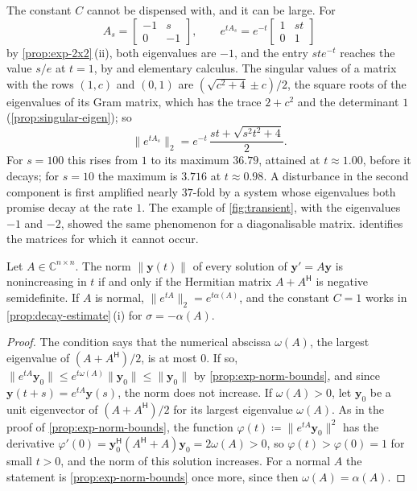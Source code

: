 The constant $C$ cannot be dispensed with, and it can be large. For
\[
A_s=\begin{bmatrix}-1&s\\0&-1\end{bmatrix},\qquad e^{tA_s}=e^{-t}\begin{bmatrix}1&st\\0&1\end{bmatrix}
\]
by \cref{prop:exp-2x2}\,(ii), both eigenvalues are $-1$, and the entry $ste^{-t}$ reaches the value $s/e$ at $t=1$, by  and elementary calculus. The singular values of a matrix with the rows $(1,c)$ and $(0,1)$ are $(\sqrt{c^2+4}\pm c)/2$, the square roots of the eigenvalues of its Gram matrix, which has the trace $2+c^2$ and the determinant $1$ (\cref{prop:singular-eigen}); so
\[
\|e^{tA_s}\|_2=e^{-t}\,\frac{st+\sqrt{s^2t^2+4}}2 .
\]
For $s=100$ this rises from $1$ to its maximum $36.79$, attained at $t\approx1.00$, before it decays; for $s=10$ the maximum is $3.716$ at $t\approx0.98$. A disturbance in the second component is first amplified nearly $37$-fold by a system whose eigenvalues both promise decay at the rate $1$. The example of \cref{fig:transient}, with the eigenvalues $-1$ and $-2$, showed the same phenomenon for a diagonalisable matrix.  identifies the matrices for which it cannot occur.

\begin{corollary}
\label{cor:monotone-decay}
Let $A\in\mathbb C^{n\times n}$. The norm $\|\mathbf y(t)\|$ of every solution of $\mathbf y'=A\mathbf y$ is nonincreasing in $t$ if and only if the Hermitian matrix $A+A^{\mathsf H}$ is negative semidefinite. If $A$ is normal, $\|e^{tA}\|_2=e^{t\alpha(A)}$, and the constant $C=1$ works in \cref{prop:decay-estimate}\,(i) for $\sigma=-\alpha(A)$.
\end{corollary}

\begin{proof}
The condition says that the numerical abscissa $\omega(A)$, the largest eigenvalue of $(A+A^{\mathsf H})/2$, is at most $0$. If so, $\|e^{tA}\mathbf y_0\|\le e^{t\omega(A)}\|\mathbf y_0\|\le\|\mathbf y_0\|$ by \cref{prop:exp-norm-bounds}, and since $\mathbf y(t+s)=e^{tA}\mathbf y(s)$, the norm does not increase. If $\omega(A)>0$, let $\mathbf y_0$ be a unit eigenvector of $(A+A^{\mathsf H})/2$ for its largest eigenvalue $\omega(A)$. As in the proof of \cref{prop:exp-norm-bounds}, the function $\varphi(t)\coloneqq\|e^{tA}\mathbf y_0\|^2$ has the derivative $\varphi'(0)=\mathbf y_0^{\mathsf H}(A^{\mathsf H}+A)\mathbf y_0=2\omega(A)>0$, so $\varphi(t)>\varphi(0)=1$ for small $t>0$, and the norm of this solution increases. For a normal $A$ the statement is \cref{prop:exp-norm-bounds} once more, since then $\omega(A)=\alpha(A)$.
\end{proof}

